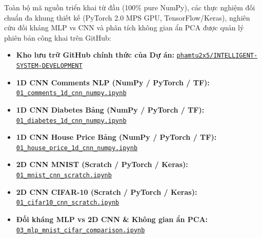 \documentclass[12pt,a4paper]{report}
\begin{document}
\begin{tcolorbox}[colback=blue!3!white, colframe=blue!75!black, top=3pt, bottom=3pt, boxsep=2pt, left=5pt, right=5pt, title=\textbf{Kho Lưu Trữ Mã Nguồn \& Hệ Thống Jupyter Notebooks Thực Nghiệm Dự Án (GitHub)}]
\footnotesize
Toàn bộ mã nguồn triển khai từ đầu (100\% pure NumPy), các thực nghiệm đối chuẩn đa khung thiết kế (PyTorch 2.0 MPS GPU, TensorFlow/Keras), nghiên cứu đối kháng MLP vs CNN và phân tích không gian ẩn PCA được quản lý phiên bản công khai trên GitHub:
\begin{itemize}[leftmargin=1.2em, itemsep=1.5pt, topsep=1pt, parsep=0pt]
    \item \textbf{Kho lưu trữ GitHub chính thức của Dự án:} \href{https://github.com/phamtu2x5/INTELLIGENT-SYSTEM-DEVELOPMENT}{\texttt{phamtu2x5/INTELLIGENT-SYSTEM-DEVELOPMENT}}
    \item \textbf{1D CNN Comments NLP (NumPy / PyTorch / TF):} \href{https://github.com/phamtu2x5/INTELLIGENT-SYSTEM-DEVELOPMENT/blob/main/src/Assigment%2004/customer_comments/notebooks/01_comments_1d_cnn_numpy.ipynb}{\texttt{01\_comments\_1d\_cnn\_numpy.ipynb}}
    \item \textbf{1D CNN Diabetes Bảng (NumPy / PyTorch / TF):} \href{https://github.com/phamtu2x5/INTELLIGENT-SYSTEM-DEVELOPMENT/blob/main/src/Assigment%2004/diabetes/notebooks/01_diabetes_1d_cnn_numpy.ipynb}{\texttt{01\_diabetes\_1d\_cnn\_numpy.ipynb}}
    \item \textbf{1D CNN House Price Bảng (NumPy / PyTorch / TF):} \href{https://github.com/phamtu2x5/INTELLIGENT-SYSTEM-DEVELOPMENT/blob/main/src/Assigment%2004/house_price/notebooks/01_house_price_1d_cnn_numpy.ipynb}{\texttt{01\_house\_price\_1d\_cnn\_numpy.ipynb}}
    \item \textbf{2D CNN MNIST (Scratch / PyTorch / Keras):} \href{https://github.com/phamtu2x5/INTELLIGENT-SYSTEM-DEVELOPMENT/blob/main/src/Assigment%2004/mnist/notebooks/01_mnist_cnn_scratch.ipynb}{\texttt{01\_mnist\_cnn\_scratch.ipynb}}
    \item \textbf{2D CNN CIFAR-10 (Scratch / PyTorch / Keras):} \href{https://github.com/phamtu2x5/INTELLIGENT-SYSTEM-DEVELOPMENT/blob/main/src/Assigment%2004/cifar10/notebooks/01_cifar10_cnn_scratch.ipynb}{\texttt{01\_cifar10\_cnn\_scratch.ipynb}}
    \item \textbf{Đối kháng MLP vs 2D CNN \& Không gian ẩn PCA:} \href{https://github.com/phamtu2x5/INTELLIGENT-SYSTEM-DEVELOPMENT/blob/main/src/Assigment%2004/03_mlp_mnist_cifar_comparison.ipynb}{\texttt{03\_mlp\_mnist\_cifar\_comparison.ipynb}}
\end{itemize}
\end{tcolorbox}
\end{document}
